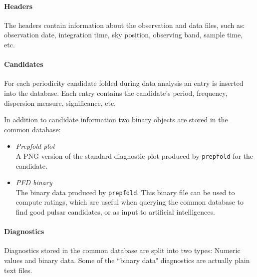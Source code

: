 \documentclass[12pt]{article}
\begin{document}
\paragraph{Headers}
The headers contain information about the observation and data files, such as: observation date, integration time, sky position, observing band, sample time, etc.

\paragraph{Candidates}
For each periodicity candidate folded during data analysis an entry is inserted into the database. Each entry contains the candidate's period, frequency, dispersion measure, significance, etc.

In addition to candidate information two binary objects are stored in the common database:
\begin{itemize}
    \item \textit{Prepfold plot} \hfill \\
        A PNG version of the standard diagnostic plot produced by \texttt{prepfold} for the candidate.
    \item \textit{PFD binary} \hfill \\
        The binary data produced by \texttt{prepfold}. This binary file can be used to compute ratings, which are useful when querying the common database to find good pulsar candidates, or as input to artificial intelligences.
\end{itemize}

\paragraph{Diagnostics}
Diagnostics stored in the common database are split into two types: Numeric values and binary data. Some of the ``binary data" diagnostics are actually plain text files.
\end{document}
